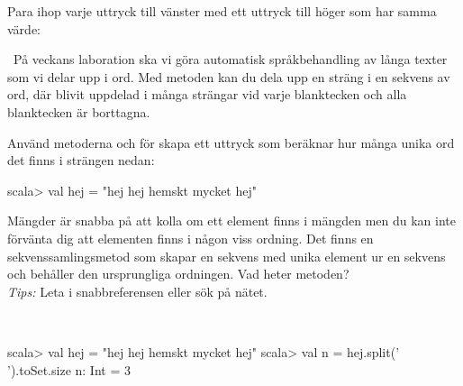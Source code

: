 \QUESTEND



\QUESTBEGIN

\Task \what

\vspace{1em}\noindent Para ihop varje uttryck till vänster med ett uttryck till höger som har samma värde:

\begin{ConceptConnections}

\end{ConceptConnections}

\SOLUTION

\TaskSolved \what

\begin{ConceptConnections}

\end{ConceptConnections}

\QUESTEND



\QUESTBEGIN

\Task \what~På veckans laboration ska vi göra automatisk språkbehandling av långa texter som vi delar upp i ord. Med metoden  kan du dela upp en sträng  i en sekvens av ord, där  blivit uppdelad i många strängar vid varje blanktecken och alla blanktecken är borttagna.

\Subtask Använd metoderna  och  för skapa ett uttryck som beräknar hur många unika ord det finns i strängen  nedan:
\begin{REPLnonum}
scala> val hej = "hej hej hemskt mycket hej"
\end{REPLnonum}

\Subtask Mängder är snabba på att kolla om ett element finns i mängden men du kan inte förvänta dig att elementen finns i någon viss ordning. Det finns en sekvenssamlingsmetod som skapar en sekvens med unika element ur en sekvens och behåller den ursprungliga ordningen. Vad heter metoden? \\\emph{Tips:} Leta i snabbreferensen eller sök på nätet.

\SOLUTION

\TaskSolved \what~

\SubtaskSolved
\begin{REPL}
scala> val hej = "hej hej hemskt mycket hej"
scala> val n = hej.split(' ').toSet.size
n: Int = 3
\end{REPL}

